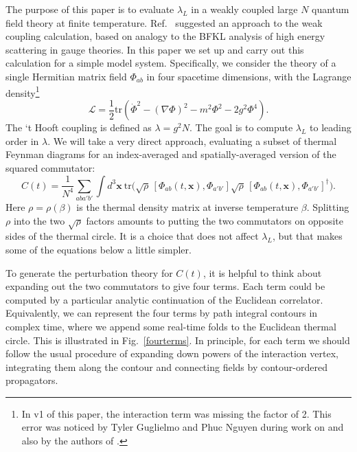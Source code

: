 \documentclass[12pt]{article}
\newcommand{\be}{\begin{equation}}
\newcommand{\ee}{\end{equation}}
\newcommand{\tr}{\text{tr}}
\begin{document}
The purpose of this paper is to evaluate $\lambda_L$ in a weakly coupled large $N$ quantum field theory at finite temperature. Ref.~\cite{Shenker:2014cwa} suggested an approach to the weak coupling calculation, based on analogy to the BFKL \cite{Kuraev:1977fs,Balitsky:1978ic} analysis of high energy scattering in gauge theories. In this paper we set up and carry out this calculation for a simple model system. Specifically, we consider the theory of a single Hermitian matrix field $\Phi_{ab}$ in four spacetime dimensions, with the Lagrange density\footnote{In v1 of this paper, the interaction term was missing the factor of 2. This error was noticed by Tyler Guglielmo and Phuc Nguyen during work on \cite{Fischler:2021rxy} and also by the authors of \cite{Grozdanov:2018atb}.}
\be
\mathcal{L} = \frac{1}{2}\tr\left( \dot{\Phi}^2 -(\nabla\Phi)^2 - m^2 \Phi^2 - 2g^2 \Phi^4\right).
\ee
The `t Hooft coupling is defined as $\lambda = g^2 N$. The goal is to compute $\lambda_L$ to leading order in $\lambda$. We will take a very direct approach, evaluating a subset of thermal Feynman diagrams for an index-averaged and spatially-averaged version of the squared commutator:
\be\label{tocompute}
C(t) = \frac{1}{N^4}\sum_{aba'b'}\int d^3\mathbf{x} \ \tr\Big( \sqrt{\rho}\, [\Phi_{ab}(t,\mathbf{x}),\Phi_{a'b'}]\sqrt{\rho}\, [\Phi_{ab}(t,\mathbf{x}),\Phi_{a'b'}]^\dag\Big).
\ee
Here $\rho = \rho(\beta)$ is the thermal density matrix at inverse temperature $\beta$. Splitting $\rho$ into the two $\sqrt{\rho}$ factors amounts to putting the two commutators on opposite sides of the thermal circle. It is a choice that does not affect $\lambda_L$, but that makes some of the equations below a little simpler.

To generate the perturbation theory for $C(t)$, it is helpful to think about expanding out the two commutators to give four terms. Each term could be computed by a particular analytic continuation of the Euclidean correlator. Equivalently, we can represent the four terms by path integral contours in complex time, where we append some real-time folds to the Euclidean thermal circle. This is illustrated in Fig.~\ref{fourterms}. In principle, for each term we should follow the usual procedure of expanding down powers of the interaction vertex, integrating them along the contour and connecting fields by contour-ordered propagators. 
\end{document}
